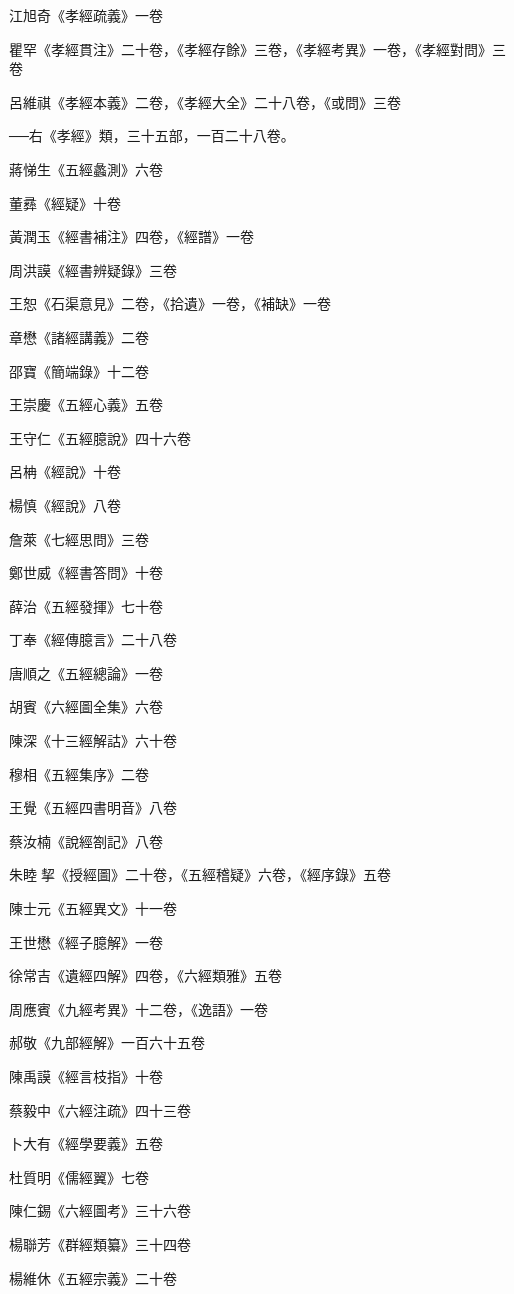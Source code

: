 江旭奇《孝經疏義》一卷

瞿罕《孝經貫注》二十卷，《孝經存餘》三卷，《孝經考異》一卷，《孝經對問》三卷

呂維祺《孝經本義》二卷，《孝經大全》二十八卷，《或問》三卷

──右《孝經》類，三十五部，一百二十八卷。

蔣悌生《五經蠡測》六卷

董彞《經疑》十卷

黃潤玉《經書補注》四卷，《經譜》一卷

周洪謨《經書辨疑錄》三卷

王恕《石渠意見》二卷，《拾遺》一卷，《補缺》一卷

章懋《諸經講義》二卷

邵寶《簡端錄》十二卷

王崇慶《五經心義》五卷

王守仁《五經臆說》四十六卷

呂柟《經說》十卷

楊慎《經說》八卷

詹萊《七經思問》三卷

鄭世威《經書答問》十卷

薛治《五經發揮》七十卷

丁奉《經傳臆言》二十八卷

唐順之《五經總論》一卷

胡賓《六經圖全集》六卷

陳深《十三經解詁》六十卷

穆相《五經集序》二卷

王覺《五經四書明音》八卷

蔡汝楠《說經劄記》八卷

朱睦挈《授經圖》二十卷，《五經稽疑》六卷，《經序錄》五卷

陳士元《五經異文》十一卷

王世懋《經子臆解》一卷

徐常吉《遺經四解》四卷，《六經類雅》五卷

周應賓《九經考異》十二卷，《逸語》一卷

郝敬《九部經解》一百六十五卷

陳禹謨《經言枝指》十卷

蔡毅中《六經注疏》四十三卷

卜大有《經學要義》五卷

杜質明《儒經翼》七卷

陳仁錫《六經圖考》三十六卷

楊聯芳《群經類纂》三十四卷

楊維休《五經宗義》二十卷

